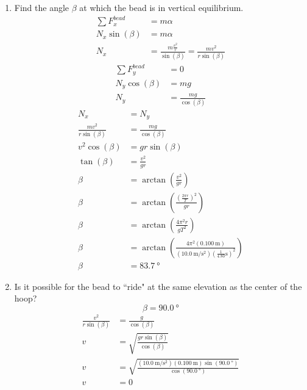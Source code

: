 \documentclass{article}
\begin{document}
\begin{enumerate}[label = \textbf{(\alph*)}]
	\item Find the angle $ \beta $ at which the bead is in vertical equilibrium.
		\begin{align*}
			\sum F_x^{bead} & = m\alpha \\
			N_x\sin(\beta) & = m\alpha \\
			N_x & = \frac{ m \frac{ v^2 }{ r } }{ \sin(\beta) } = \frac{ mv^2 }{ r\sin(\beta) }
		\end{align*}
		\begin{align*}
			\sum F_y^{bead} & = 0 \\
			N_y\cos(\beta) & = mg \\
			N_y & = \frac{ mg }{ \cos(\beta) }
		\end{align*}
		\begin{align*}
			N_x & = N_y \\
			\frac{ mv^2 }{ r\sin(\beta) } & = \frac{ mg }{ \cos(\beta) } \\
			v^2\cos(\beta) & = gr\sin(\beta) \\
			\tan(\beta) & = \frac{ v^2 }{ gr } \\
			\beta & = \arctan \left( \frac{ v^2 }{ gr } \right) \\
			\beta & = \arctan \left( \frac{ \left( \frac{ 2\pi r }{ T } \right)^2 }{ gr } \right) \\
			\beta & = \arctan \left( \frac{ 4\pi^2r }{ gT^2 } \right) \\
			\beta & = \arctan \left( \frac{ 4\pi^2(\SI{0.100}{\meter}) }{ (\SI{10.0}{\meter \per \second \squared}) \left( \frac{1}{4.80}\text{s} \right)^2 } \right) \\
			\beta & = \SI{83.7}{\degree}
		\end{align*}
	\item Is it possible for the bead to ``ride" at the same elevation as the center of the hoop?
		\begin{equation*} \beta = \SI{90.0}{\degree} \end{equation*}
		\begin{align*}
			\frac{ v^2 }{ r\sin(\beta) } & = \frac{ g }{ \cos(\beta) } \\
			v & = \sqrt{ \frac{ gr\sin(\beta) }{ \cos(\beta) } } \\
			v & = \sqrt{ \frac{ (\SI{10.0}{\meter \per \second \squared})(\SI{0.100}{\meter})\sin(\SI{90.0}{\degree}) }{ \cos(\SI{90.0}{\degree}) } } \\
			v & = 0

\end{align*}
\end{enumerate}
\end{document}
